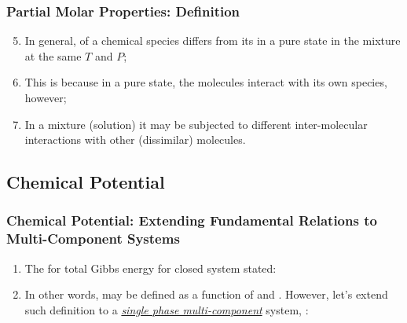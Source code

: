 \documentclass[10pt,compress,unknownkeysallowed]{beamer}
\begin{document}
\begin{frame}
  \frametitle{Partial Molar Properties: Definition}
  \begin{enumerate}\setcounter{enumi}{4}
    \item<1-> In general,  of a chemical species differs from its  in a pure state in the mixture at the same $T$ and $P$; %
    \item<2-> This is because in a pure state, the molecules interact with its own species, however;
    \item<3-> In a mixture (\ie solution) it may be subjected to different inter-molecular interactions with other (dissimilar) molecules. 
  \end{enumerate}
\end{frame}
\normalsize

\subsection{Chemical Potential}  

\begin{frame}
  \frametitle{Chemical Potential: Extending Fundamental Relations to Multi-Component Systems} 
  \begin{enumerate}
    \item<1-> The  for total Gibbs energy  for closed system stated:
     \item<2-> In other words,  may be defined as a function of  and . However, let's extend such definition to a \underline{\it single phase multi-component} system, \ie {}:
  \end{enumerate}
\end{frame}
\normalsize
  
\end{document}

